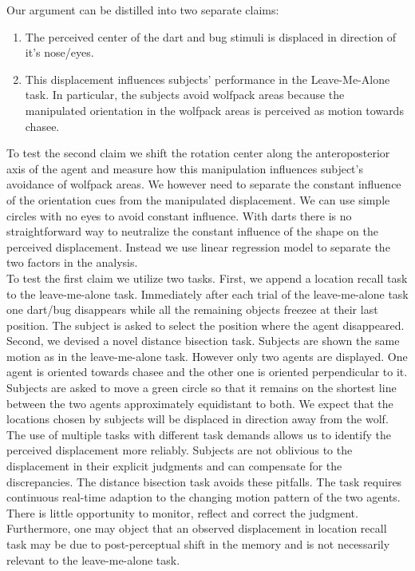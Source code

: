 \documentclass[10pt]{article}
\begin{document}
Our argument can be distilled into two separate claims:
\begin{enumerate}
  \item The perceived center of the dart and bug stimuli is displaced in direction of it's nose/eyes.
  \item This displacement influences subjects' performance in the Leave-Me-Alone task. 
In particular, the subjects avoid wolfpack areas because the manipulated orientation in the wolfpack areas is perceived as motion towards chasee.
\end{enumerate}  
To test the second claim we shift the rotation center along the anteroposterior axis of the agent and measure how this manipulation influences subject's avoidance of wolfpack areas. We however need to separate the constant influence of the orientation cues from the manipulated displacement. We can use simple circles with no eyes to avoid constant influence. With darts there is no straightforward way to neutralize the constant influence of the shape on the perceived displacement. Instead we use linear regression model to separate the two factors in the analysis.\\
To test the first claim we utilize two tasks. 
First, we append a location recall task to the leave-me-alone task. 
Immediately after each trial of the leave-me-alone task one dart/bug disappears while all the remaining objects freezee at their last position. 
The subject is asked to select the position where the agent disappeared.
Second, we devised a novel distance bisection task. 
Subjects are shown the same motion as in the leave-me-alone task. 
However only two agents are displayed. 
One agent is oriented towards chasee and the other one is oriented perpendicular to it. 
Subjects are asked to move a green circle so that it remains on the shortest line between the two agents approximately equidistant to both. 
We expect that the locations chosen by subjects will be displaced in direction away from the wolf. 
The use of multiple tasks with different task demands allows us to identify the perceived displacement more reliably. 
Subjects are not oblivious to the displacement in their explicit judgments and can compensate for the discrepancies. %
The distance bisection task avoids these pitfalls.
The task requires continuous real-time adaption to the changing motion pattern of the two agents. 
There is little opportunity to monitor, reflect and correct the judgment. 
Furthermore, one may object that an observed displacement in location recall task may be due to post-perceptual shift in the memory and is not necessarily relevant to the leave-me-alone task. 
\end{document}
